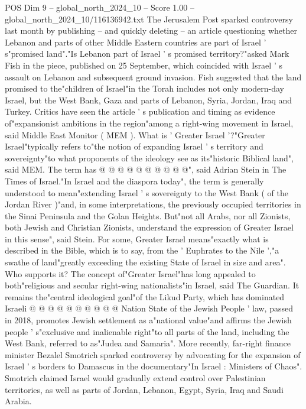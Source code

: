 \begin{textsample}{POS Dim 9 – global\_north\_2024\_10 – Score 1.00 – global\_north\_2024\_10/116136942.txt}  \label{ex:f9_pos_225}
The Jerusalem Post sparked controversy last month by publishing -- and quickly deleting -- an article questioning whether Lebanon and parts of other Middle Eastern countries are part of Israel ' s"promised land"."Is Lebanon part of Israel ' s promised territory?"asked Mark Fish in the piece, published on 25 September, which coincided with Israel ' s assault on Lebanon and subsequent ground invasion.
Fish suggested that the land promised to the"children of Israel"in the Torah includes not only modern-day Israel, but the West Bank, Gaza and parts of Lebanon, Syria, Jordan, Iraq and Turkey.
Critics have seen the article ' s publication and timing as evidence of"expansionist ambitions in the region"among a right-wing movement in Israel, said Middle East Monitor ( MEM ).
What is ' Greater Israel '?"Greater Israel"typically refers to"the notion of expanding Israel ' s territory and sovereignty"to what proponents of the ideology see as its"historic Biblical land", said MEM.
The term has @ @ @ @ @ @ @ @ @ @", said Adrian Stein in The Times of Israel."In Israel and the diaspora today", the term is generally understood to mean"extending Israel ' s sovereignty to the West Bank ( of the Jordan River )"and, in some interpretations, the previously occupied territories in the Sinai Peninsula and the Golan Heights.
But"not all Arabs, nor all Zionists, both Jewish and Christian Zionists, understand the expression of Greater Israel in this sense", said Stein.
For some, Greater Israel means"exactly what is described in the Bible, which is to say, from the ' Euphrates to the Nile ',"a swathe of land"greatly exceeding the existing State of Israel in size and area".
Who supports it?
The concept of"Greater Israel"has long appealed to both"religious and secular right-wing nationalists"in Israel, said The Guardian.
It remains the"central ideological goal"of the Likud Party, which has dominated Israeli @ @ @ @ @ @ @ @ @ @ Nation State of the Jewish People ' law, passed in 2018, promotes Jewish settlement as a"national value"and affirms the Jewish people ' s"exclusive and inalienable right"to all parts of the land, including the West Bank, referred to as"Judea and Samaria".
More recently, far-right finance minister Bezalel Smotrich sparked controversy by advocating for the expansion of Israel ' s borders to Damascus in the documentary"In Israel : Ministers of Chaos".
Smotrich claimed Israel would gradually extend control over Palestinian territories, as well as parts of Jordan, Lebanon, Egypt, Syria, Iraq and Saudi Arabia.

\end{textsample}
